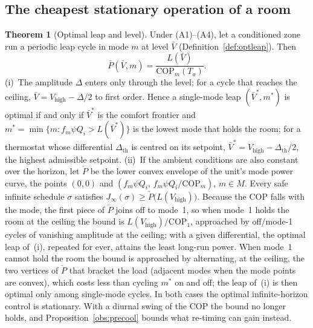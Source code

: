 \documentclass[10pt,a4paper,twocolumn]{article}
\theoremstyle{definition}
\newtheorem{theorem}{Theorem}
\begin{document}
\subsection{The cheapest stationary operation of a room}\label{sec:optleapsec}\label{sec:infinite}
\begin{theorem}[Optimal leap and level]\label{thm:optleap}
Under (A1)--(A4), let a conditioned zone run a periodic leap cycle in mode $m$ at level $\bar V$ (Definition~\ref{def:optleap}). Then
\begin{equation}\label{eq:meanpower}
\bar P(\bar V,m)=\frac{L(\bar V)}{\mathrm{COP}_m(T_a)}.
\end{equation}
(i)~The amplitude $\Delta$ enters only through the level; for a cycle that reaches the ceiling, $\bar V=V_{\text{high}}-\Delta/2$ to first order. Hence a single-mode leap $(\bar V^\ast,m^\ast)$ is optimal if and only if $\bar V^\ast$ is the comfort frontier and $m^\ast=\min\{m: f_m\psi Q_i>L(\bar V^\ast)\}$ is the lowest mode that holds the room; for a thermostat whose differential $\Delta_{\text{th}}$ is centred on its setpoint, $\bar V^\ast=V_{\text{high}}-\Delta_{\text{th}}/2$, the highest admissible setpoint. (ii)~If the ambient conditions are also constant over the horizon, let $\check P$ be the lower convex envelope of the unit's mode power curve, the points $(0,0)$ and $(f_m\psi Q_i,\,f_m\psi Q_i/\mathrm{COP}_m)$, $m\in M$. Every safe infinite schedule $\sigma$ satisfies $J_\infty(\sigma)\ge\check P\bigl(L(V_{\text{high}})\bigr)$. Because the COP falls with the mode, the first piece of $\check P$ joins off to mode~1, so when mode~1 holds the room at the ceiling the bound is $L(V_{\text{high}})/\mathrm{COP}_1$, approached by off/mode-1 cycles of vanishing amplitude at the ceiling; with a given differential, the optimal leap of~(i), repeated for ever, attains the least long-run power. When mode~1 cannot hold the room the bound is approached by alternating, at the ceiling, the two vertices of $\check P$ that bracket the load (adjacent modes when the mode points are convex), which costs less than cycling $m^\ast$ on and off; the leap of~(i) is then optimal only among single-mode cycles. In both cases the optimal infinite-horizon control is stationary. With a diurnal swing of the COP the bound no longer holds, and Proposition~\ref{obs:precool} bounds what re-timing can gain instead.
\end{theorem}
\end{document}
